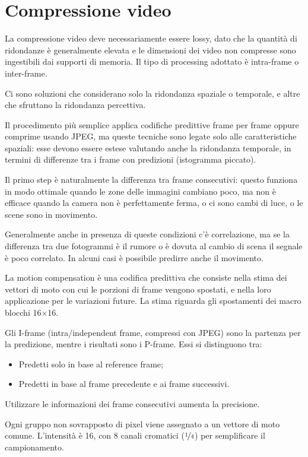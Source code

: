 \section{Compressione video}
La compressione video deve necessariamente essere lossy, dato che la quantità di ridondanze è generalmente elevata e le dimensioni dei video non compresse sono ingestibili dai supporti di memoria. Il tipo di processing adottato è intra-frame o inter-frame. 

Ci sono soluzioni che considerano solo la ridondanza spaziale o temporale, e altre che sfruttano la ridondanza percettiva. 

Il procedimento più semplice applica codifiche predittive frame per frame oppure comprime usando JPEG, ma queste tecniche sono legate solo alle caratteristiche spaziali: esse devono essere estese valutando anche la ridondanza temporale, in termini di differenze tra i frame con predizioni (istogramma piccato).

Il primo step è naturalmente la differenza tra frame consecutivi: questo funziona in modo ottimale quando le zone delle immagini cambiano poco, ma non è efficace quando la camera non è perfettamente ferma, o ci sono cambi di luce, o le scene sono in movimento.

Generalmente anche in presenza di queste condizioni c'è correlazione, ma se la differenza tra due fotogrammi è il rumore o è dovuta al cambio di scena il segnale è poco correlato. In alcuni casi è possibile predirre anche il movimento.

La motion compensation è una codifica predittiva che consiste nella stima dei vettori di moto con cui le porzioni di frame vengono spostati, e nella loro applicazione per le variazioni future. La stima riguarda gli spostamenti dei macro blocchi 16$\times$16.

Gli I-frame (intra/independent frame, compressi con JPEG) sono la partenza per la predizione, mentre i risultati sono i P-frame. Essi si distinguono tra:
\begin{itemize}
	\item Predetti solo in base al reference frame;
	\item Predetti in base al frame precedente e ai frame successivi. 
\end{itemize}
Utilizzare le informazioni dei frame consecutivi aumenta la precisione.

Ogni gruppo non sovrapposto di pixel viene assegnato a un vettore di moto comune. L'intensità è 16, con 8 canali cromatici ($\nicefrac{1}{4}$) per semplificare il campionamento. 

